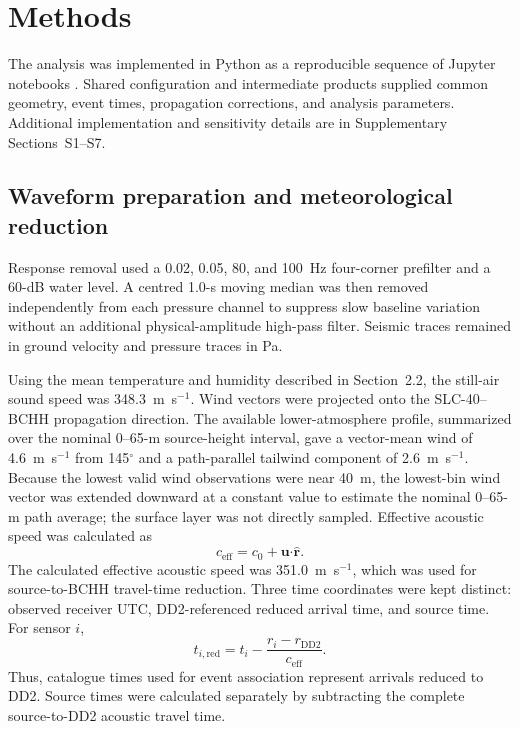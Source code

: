 \documentclass[]{seismica}
\begin{document}
\FloatBarrier

\section{Methods}
\label{sec:methods}

The analysis was implemented in Python as a reproducible sequence of Jupyter
notebooks \citep{kluyver2016jupyter}. Shared configuration and intermediate
products supplied common geometry, event times, propagation corrections, and
analysis parameters. Additional implementation and sensitivity details are in
Supplementary Sections~S1--S7.

\subsection{Waveform preparation and meteorological reduction}

Response removal used a 0.02, 0.05, 80, and 100~Hz four-corner prefilter and a
60-dB water level. A centred 1.0-s moving median was then removed independently
from each pressure channel to suppress slow baseline variation without an
additional physical-amplitude high-pass filter. Seismic traces remained in
ground velocity and pressure traces in Pa.

Using the mean temperature and humidity described in Section~2.2, the
still-air sound speed was 348.3~m~s$^{-1}$. Wind vectors were projected onto
the SLC-40--BCHH propagation direction. The available lower-atmosphere profile,
summarized over the nominal 0--65-m source-height interval, gave a vector-mean
wind of 4.6~m~s$^{-1}$ from 145$^\circ$ and a path-parallel tailwind component
of 2.6~m~s$^{-1}$. Because the lowest valid wind observations were near 40~m,
the lowest-bin wind vector was extended downward at a constant value to
estimate the nominal 0--65-m path average; the surface layer was not directly
sampled.
Effective acoustic speed was calculated as
\begin{equation}
 c_{\mathrm{eff}}=c_0+\mathbf{u}\boldsymbol{\cdot}\hat{\mathbf{r}}.
 \label{eq:effective_speed}
\end{equation}
The calculated effective acoustic speed was 351.0~m~s$^{-1}$, which was used
for source-to-BCHH travel-time reduction.
Three time coordinates were kept distinct: observed
receiver UTC, DD2-referenced reduced arrival time, and source time. For sensor
$i$,
\begin{equation}
 t_{i,\mathrm{red}}=t_i-\frac{r_i-r_{\mathrm{DD2}}}{c_{\mathrm{eff}}}.
 \label{eq:reduced_time}
\end{equation}
Thus, catalogue times used for event association represent arrivals reduced
to DD2. Source times were calculated separately by subtracting the complete
source-to-DD2 acoustic travel time.
\end{document}
